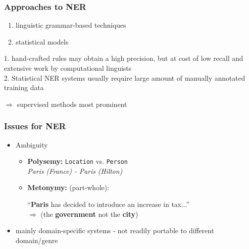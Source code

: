 \documentclass[10pt]{beamer}
\begin{document}
 


\begin{frame}
\frametitle{Approaches to NER}

\begin{enumerate}
 \item linguistic grammar-based techniques
 \item statistical models
\end{enumerate}

1. hand-crafted rules may obtain a high precision, but at cost of low recall
and extensive work by computational linguists\\

2. Statistical NER systems usually require large amount of manually annotated training data

$\Rightarrow$ supervised methods most prominent


\end{frame}


\begin{frame}
\frametitle{Issues for NER}


\begin{itemize}
 \item Ambiguity


\begin{itemize}
 \item \textbf{Polysemy:} \texttt{Location} vs. \texttt{Person} \\
 
 \emph{Paris (France) - Paris (Hilton)}\\
 
 \item \textbf{Metonymy:}  (part-whole):
 
 ``\textbf{Paris} has decided to introduce an increase in tax...'' \\
 
 $\Rightarrow$ (the \textbf{government} not the \textbf{city})  
\end{itemize}

 \item mainly domain-specific systems - not readily portable to different domain/genre %
 
\end{itemize}

\end{frame}
\end{document}

